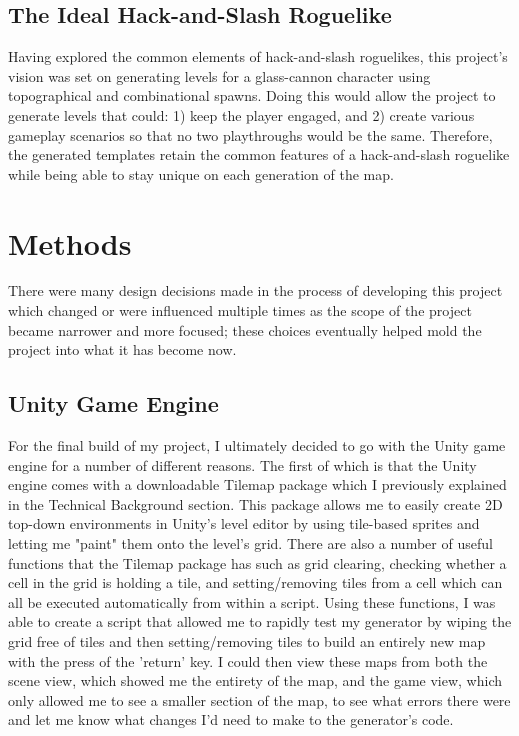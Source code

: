 \documentclass[10pt,twocolumn]{article}
\begin{document}
\subsection{The Ideal Hack-and-Slash Roguelike}

Having explored the common elements of hack-and-slash roguelikes, this project's vision was set on generating levels for a glass-cannon character using topographical and combinational spawns. Doing this would allow the project to generate levels that could: 1) keep the player engaged, and 2) create various gameplay scenarios so that no two playthroughs would be the same. Therefore, the generated templates retain the common features of a hack-and-slash roguelike while being able to stay unique on each generation of the map. 

\section{Methods}

There were many design decisions made in the process of developing this project which changed or were influenced multiple times as the scope of the project became narrower and more focused; these choices eventually helped mold the project into what it has become now.

\subsection{Unity Game Engine}

For the final build of my project, I ultimately decided to go with the Unity game engine for a number of different reasons. The first of which is that the Unity engine comes with a downloadable Tilemap package which I previously explained in the Technical Background section. This package allows me to easily create 2D top-down environments in Unity's level editor by using tile-based sprites and letting me "paint" them onto the level's grid. There are also a number of useful functions that the Tilemap package has such as grid clearing, checking whether a cell in the grid is holding a tile, and setting/removing tiles from a cell which can all be executed automatically from within a script. Using these functions, I was able to create a script that allowed me to rapidly test my generator by wiping the grid free of tiles and then setting/removing tiles to build an entirely new map with the press of the 'return' key. I could then view these maps from both the scene view, which showed me the entirety of the map, and the game view, which only allowed me to see a smaller section of the map, to see what errors there were and let me know what changes I'd need to make to the generator's code. 
\end{document}
